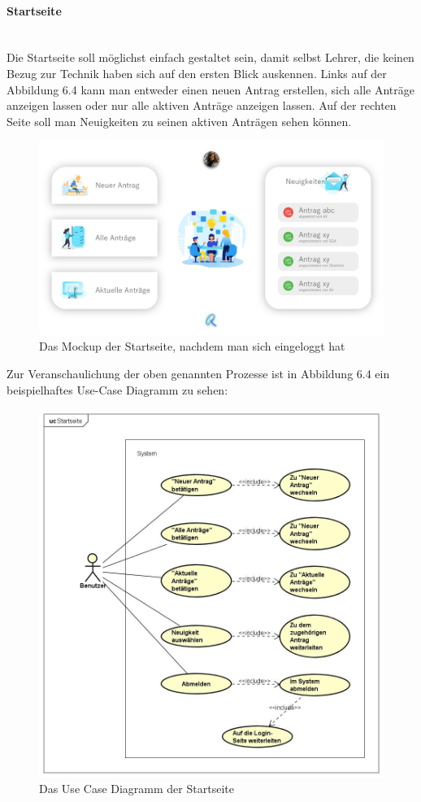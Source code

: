 \paragraph{Startseite}
~\\
Die Startseite soll möglichst einfach gestaltet sein, damit selbst Lehrer, die keinen Bezug zur Technik haben sich auf den ersten Blick auskennen. Links auf der Abbildung 6.4 kann man entweder einen neuen Antrag erstellen, sich alle Anträge anzeigen lassen oder nur alle aktiven Anträge anzeigen lassen. Auf der rechten Seite soll man Neuigkeiten zu seinen aktiven Anträgen sehen können.
\begin{figure}[H]
	\centering
	\includegraphics[width=1\linewidth]{images/Mockup-Startseite-eingeloggt}
	\caption[Mockup Startseite]{Das Mockup der Startseite, nachdem man sich eingeloggt hat}
	\label{fig:mockupStart}
\end{figure}
Zur Veranschaulichung der oben genannten Prozesse ist in Abbildung 6.4 ein beispielhaftes Use-Case Diagramm zu sehen: 
\begin{figure}[H]
	\centering
	\includegraphics[width=1\linewidth]{images/uc-start}
	\caption[Use Case Diagramm Login]{Das Use Case Diagramm der Startseite}
	\label{fig:ucStart}
\end{figure}
